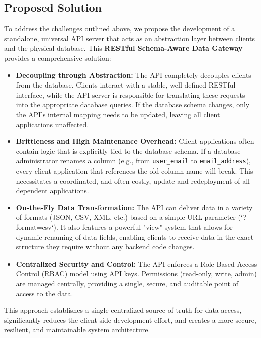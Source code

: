 \documentclass[12pt, a4paper]{report}
\begin{document}
\subsection{Proposed Solution}
To address the challenges outlined above, we propose the development of a standalone, universal API server that acts as an abstraction layer between clients and the physical database. This \textbf{RESTful Schema-Aware Data Gateway} provides a comprehensive solution:
\begin{itemize}
    \item \textbf{Decoupling through Abstraction:} The API completely decouples clients from the database. Clients interact with a stable, well-defined RESTful interface, while the API server is responsible for translating these requests into the appropriate database queries. If the database schema changes, only the API's internal mapping needs to be updated, leaving all client applications unaffected.
  \item \textbf{Brittleness and High Maintenance Overhead:} Client applications often contain logic that is explicitly tied to the database schema. If a database administrator renames a column (e.g., from \lstinline!user_email! to \lstinline!email_address!), every client application that references the old column name will break. This necessitates a coordinated, and often costly, update and redeployment of all dependent applications.
    \item \textbf{On-the-Fly Data Transformation:} The API can deliver data in a variety of formats (JSON, CSV, XML, etc.) based on a simple URL parameter (`?format=csv`). It also features a powerful "view" system that allows for dynamic renaming of data fields, enabling clients to receive data in the exact structure they require without any backend code changes.
    \item \textbf{Centralized Security and Control:} The API enforces a Role-Based Access Control (RBAC) model using API keys. Permissions (read-only, write, admin) are managed centrally, providing a single, secure, and auditable point of access to the data.
\end{itemize}
This approach establishes a single centralized source of truth for data access, significantly reduces the client-side development effort, and creates a more secure, resilient, and maintainable system architecture.

\end{document}
